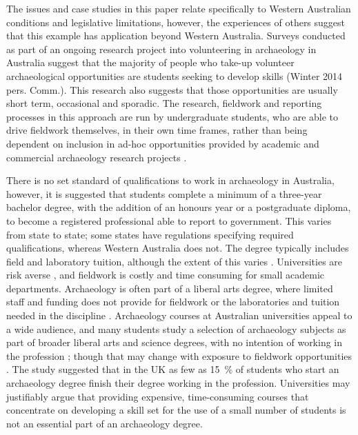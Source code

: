 	The issues and case studies in this paper relate specifically to Western Australian conditions and legislative limitations, however, the experiences of others \parencites[e.g.][]{boytner2012}{mytum2012a}{mytum2012b}{scarlett2012} suggest that this example has application beyond Western Australia.
	Surveys conducted as part of an ongoing research project into volunteering in archaeology in Australia suggest that the majority of people who take-up volunteer archaeological opportunities are students seeking to develop skills (Winter 2014 pers. Comm.).
	This research also suggests that those opportunities are usually short term, occasional and sporadic. 
	The research, fieldwork and reporting processes in this approach are run by undergraduate students, who are able to drive fieldwork themselves, in their own time frames, rather than being dependent on inclusion in ad-hoc opportunities provided by academic and commercial archaeology research projects \parencites[see][90]{boytner2012}[222]{clark2012}[70-72]{colley2012}. 
	
	There is no set standard of qualifications to work in archaeology in Australia, however, it is suggested that students complete a minimum of a three-year bachelor degree, with the addition of an honours year or a postgraduate diploma, to become a registered professional able to report to government. 
	This varies from state to state; some states have regulations specifying required qualifications, whereas Western Australia does not. 
	The degree typically includes field and laboratory tuition, although the extent of this varies \parencite{gibbs2005}. 
	Universities are risk averse \parencite[6]{boytner2012}, and fieldwork is costly and time consuming for small academic departments. 
	Archaeology is often part of a liberal arts degree, where limited staff and funding does not provide for fieldwork or the laboratories and tuition needed in the discipline \parencites{colley2004}{colley2012}{gibbs2005}{cosgrove2013}. 
	Archaeology courses at Australian universities appeal to a wide audience, and many students study a selection of archaeology subjects as part of broader liberal arts and science degrees, with no intention of working in the profession \parencites[28]{gibbs2005}[44]{cosgrove2013}; 
	though that may change with exposure to fieldwork opportunities \parencite[29]{cobb2012}. 
	The \textcite[31]{cobb2012} study suggested that in the UK as few as \SI{15}{\percent} of students who start an archaeology degree finish their degree working in the profession. 
	Universities may justifiably argue that providing expensive, time-consuming courses that concentrate on developing a skill set for the use of a small number of students is not an essential part of an archaeology degree.
	
